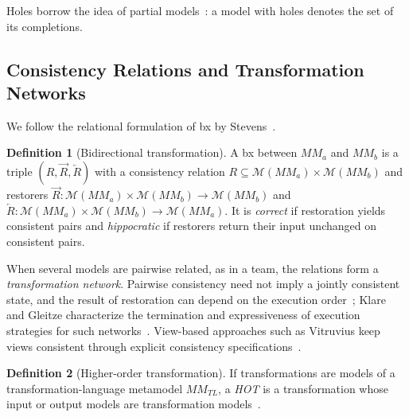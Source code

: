 \documentclass[10pt, anonymous, conference]{IEEEtran}
\theoremstyle{definition}
\newtheorem{definition}{Definition}[section]
\theoremstyle{plain}
\theoremstyle{remark}
\newcommand{\MM}{\mathit{MM}}
\newcommand{\Mods}[1]{\mathcal{M}(#1)}
\newcommand{\TL}{\mathit{TL}}
\newcommand{\fwd}[1]{\overrightarrow{#1}}
\newcommand{\bwd}[1]{\overleftarrow{#1}}
\begin{document}
Holes borrow the idea of partial models~\cite{famelis2012partial}: a model
with holes denotes the set of its completions.

\subsection{Consistency Relations and Transformation Networks}
\label{subsec:bx}
We follow the relational formulation of bx by Stevens~\cite{stevens2010qvt}.

\begin{definition}[Bidirectional transformation]\label{def:bx}
A bx between $\MM_a$ and $\MM_b$ is a triple $(R,\fwd{R},\bwd{R})$ with a
consistency relation $R\subseteq\Mods{\MM_a}\times\Mods{\MM_b}$ and restorers
$\fwd{R}\colon\Mods{\MM_a}\times\Mods{\MM_b}\to\Mods{\MM_b}$ and
$\bwd{R}\colon\Mods{\MM_a}\times\Mods{\MM_b}\to\Mods{\MM_a}$. It is
\emph{correct} if restoration yields consistent pairs and \emph{hippocratic}
if restorers return their input unchanged on consistent pairs.
\end{definition}

When several models are pairwise related, as in a team, the relations form a
\emph{transformation network}. Pairwise consistency need not imply a jointly
consistent state, and the result of restoration can depend on the execution
order~\cite{stevens2020networks}; Klare and Gleitze characterize the
termination and expressiveness of execution strategies for such
networks~\cite{klare2023termination}. View-based approaches such as
Vitruvius keep views consistent through explicit consistency
specifications~\cite{klare2021vitruvius}.

\begin{definition}[Higher-order transformation]\label{def:hot}
If transformations are models of a transformation-language metamodel
$\MM_{\TL}$, a \emph{HOT} is a transformation whose input or output models are
transformation models~\cite{tisi2009hot}.
\end{definition}
\end{document}
